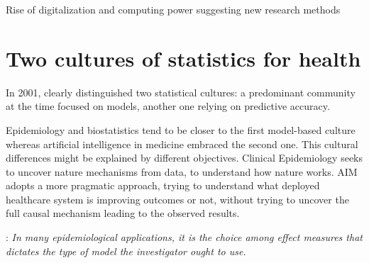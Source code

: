 \documentclass[french,12pt,twoside,a4paper]{book}
\begin{document}
Rise of digitalization and computing power suggesting new research methods

\section{Two cultures of statistics for health}\label{sec:intro:two_cultures}

In 2001, \cite{breiman2001statistical} clearly distinguished two statistical
cultures: a predominant community at the time focused on models, another one
relying on predictive accuracy.

Epidemiology and biostatistics tend to be closer to the first model-based culture
whereas artificial intelligence in medicine embraced the second one. This
cultural differences might be explained by different objectives. Clinical
Epidemiology seeks to uncover nature mechanisms from data, to understand how
nature works. AIM adopts a more pragmatic approach, trying to understand what
deployed healthcare system is improving outcomes or not, without trying to
uncover the full causal mechanism leading to the observed results.

\citep{rothman2012epidemiology}: \textit{In many epidemiological applications, it is the choice among effect
  measures that dictates the type of model the investigator ought to use.}
\end{document}
